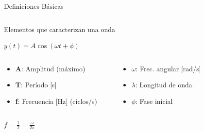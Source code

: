\documentclass[
    10pt,
    aspectratio=169,
    xcolor={dvipsnames},
    spanish,
    ]{beamer}
\begin{document}
\begin{frame}{Definiciones Básicas}
    \begin{columns}[T,totalwidth=\textwidth]
      \begin{column}{0.5\textwidth}
        \scriptsize
        \begin{block}{Elementos que caracterizan una onda}
          \vspace{-0.3em}
          \begin{center}{\normalsize{\( y(t)=A\cos(\omega t + \phi) \)}}\end{center}
          \vspace{-0.6em}
          \begin{columns}[T,onlytextwidth]
            \begin{column}{0.4\textwidth}
              \setlength{\itemsep}{2pt}\setlength{\parskip}{0pt}
              \begin{itemize}
                \item \textbf{A}: Amplitud (máximo)
                \item \textbf{T}: Período [s]
                \item \textbf{f}: Frecuencia [Hz] (ciclos/s)
              \end{itemize}
            \end{column}
            \begin{column}{0.5\textwidth}
              \setlength{\itemsep}{2pt}\setlength{\parskip}{0pt}
              \begin{itemize}
                \item \textbf{$\omega$}: Frec. angular [rad/s]
                \item \textbf{$\lambda$}: Longitud de onda
                \item \textbf{$\phi$}: Fase inicial
              \end{itemize}
            \end{column}
          \end{columns}
          \vspace{-0.6em}
          \begin{center}\( f = \tfrac{1}{T} = \tfrac{\omega}{2\pi} \)\end{center}
        \end{block}
      \end{column}
      \begin{column}{0.42\textwidth}
        \centering

\end{column}
\end{columns}
\end{frame}
\end{document}
